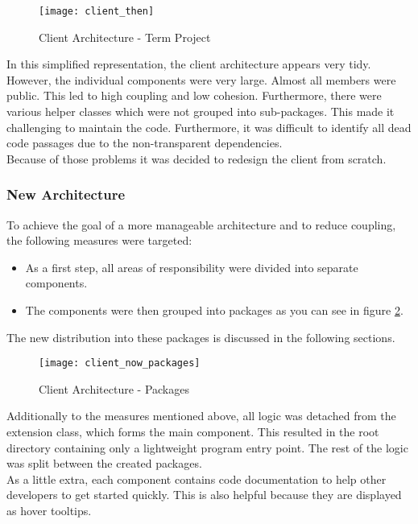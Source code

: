 \begin{figure}[h]
    \centering
    \texttt{[image: client\_then]}
    \caption{Client Architecture - Term Project}
    \label{fig:client_then}
\end{figure}

In this simplified representation, the client architecture appears very tidy.
However, the individual components were very large.
Almost all members were public.
This led to high coupling and low cohesion.
Furthermore, there were various helper classes which were not grouped into sub-packages.
This made it challenging to maintain the code.
Furthermore, it was difficult to identify all dead code passages due to the non-transparent dependencies.\\

Because of those problems it was decided to redesign the client from scratch.

\subsubsection{New Architecture}
To achieve the goal of a more manageable architecture and to reduce coupling, the following measures were targeted:
\begin{itemize}
    \item As a first step, all areas of responsibility were divided into separate components.
    \item The components were then grouped into packages as you can see in figure \ref{fig:client_now_packages}.
\end{itemize}
The new distribution into these packages is discussed in the following sections.\\

\begin{figure}[h]
    \centering
    \texttt{[image: client\_now\_packages]}
    \caption{Client Architecture - Packages}
    \label{fig:client_now_packages}
\end{figure}

Additionally to the measures mentioned above, all logic was detached from the extension class, which forms the main component.
This resulted in the root directory containing only a lightweight program entry point.
The rest of the logic was split between the created packages.\\

As a little extra, each component contains code documentation to help other developers to get started quickly.
This is also helpful because they are displayed as hover tooltips.

